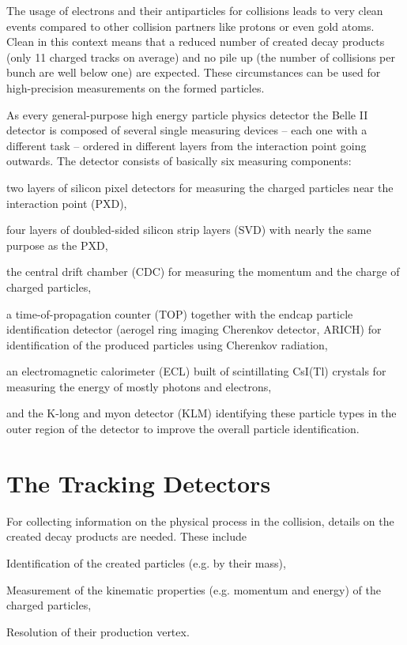The usage of electrons and their antiparticles for collisions leads to very clean events compared to other collision partners like protons or even gold atoms. Clean in this context means that a reduced number of created decay products (only 11 charged tracks on average) and no pile up (the number of collisions per bunch are well below one) are expected. These circumstances can be used for high-precision measurements on the formed particles.

As every general-purpose high energy particle physics detector the Belle II detector is composed of several single measuring devices -- each one with a different task -- ordered in different layers from the interaction point going outwards. The detector consists of basically six measuring components:
\begin{zlist}
  \item two layers of silicon pixel detectors for measuring the charged particles near the interaction point (PXD),
  \item four layers of doubled-sided silicon strip layers (SVD) with nearly the same purpose as the PXD,
  \item the central drift chamber (CDC) for measuring the momentum and the charge of charged particles,
  \item a time-of-propagation counter (TOP) together with the endcap particle identification detector (aerogel ring imaging Cherenkov detector, ARICH) for identification of the produced particles using Cherenkov radiation,
  \item an electromagnetic calorimeter (ECL) built of scintillating CsI(Tl) crystals for measuring the energy of mostly photons and electrons,
  \item and the K-long and myon detector (KLM) identifying these particle types in the outer region of the detector to improve the overall particle identification.
\end{zlist}

\section{The Tracking Detectors}

For collecting information on the physical process in the collision, details on the created decay products are needed. These include
\begin{zlist}
 \item Identification of the created particles (e.g. by their mass),
 \item Measurement of the kinematic properties (e.g. momentum and energy) of the charged particles,
 \item Resolution of their production vertex.
\end{zlist}

